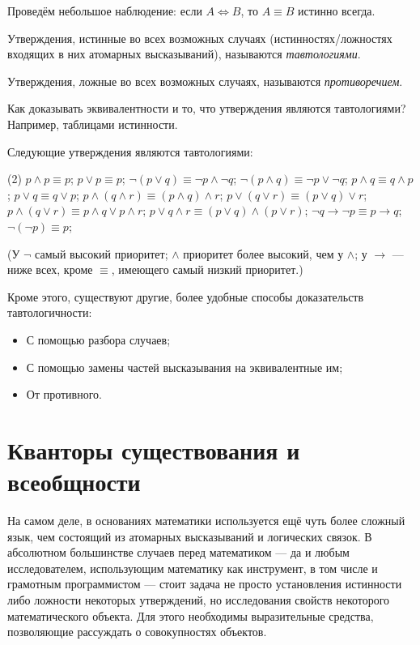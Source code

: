 Проведём небольшое наблюдение: если $A\Leftrightarrow B$, то $A\equiv B$ истинно
всегда.

\begin{defn}
  Утверждения, истинные во всех возможных случаях (истинностях/ложностях
  входящих в них атомарных высказываний), называются \textit{тавтологиями}.
\end{defn}

\begin{defn}
  Утверждения, ложные во всех возможных случаях, называются
  \textit{противоречием}.
\end{defn}

Как доказывать эквивалентности и то, что утверждения являются тавтологиями?
Например, таблицами истинности.

\begin{ex}
  Следующие утверждения являются тавтологиями:
  \begin{tasks}(2)
    \task $p\land p\equiv p$;
    \task $p\lor p\equiv p$;
    \task $\neg(p\lor q)\equiv\neg p\land\neg q$;
    \task $\neg(p\land q)\equiv\neg p\lor\neg q$;
    \task $p\land q\equiv q\land p$;
    \task $p\lor q\equiv q\lor p$;
    \task $p\land(q\land r)\equiv(p\land q)\land r$;
    \task $p\lor(q\lor r)\equiv(p\lor q)\lor r$;
    \task $p\land(q\lor r)\equiv p\land q\lor p\land r$;
    \task $p\lor q\land r\equiv (p\lor q)\land(p\lor r)$;
    \task $\neg q\to\neg p\equiv p\to q$;
    \task $\neg(\neg p)\equiv p$;
  \end{tasks}
  (У $\neg$ самый высокий приоритет; $\land$ приоритет более высокий, чем у
  $\land$; у $\to$ --- ниже всех, кроме $\equiv$, имеющего самый низкий
  приоритет.)
\end{ex}

Кроме этого, существуют другие, более удобные способы доказательств
тавтологичности:
\begin{itemize}
  \item С помощью разбора случаев;
  \item С помощью замены частей высказывания на эквивалентные им;
  \item От противного.
\end{itemize}

\section{Кванторы существования и всеобщности}

На самом деле, в основаниях математики используется ещё чуть более сложный язык,
чем состоящий из атомарных высказываний и логических связок. В абсолютном
большинстве случаев перед математиком --- да и любым исследователем,
использующим математику как инструмент, в том числе и грамотным программистом
--- стоит задача не просто установления истинности либо ложности некоторых
утверждений, но исследования свойств некоторого математического объекта.
Для этого необходимы выразительные средства, позволяющие рассуждать о
совокупностях объектов.

